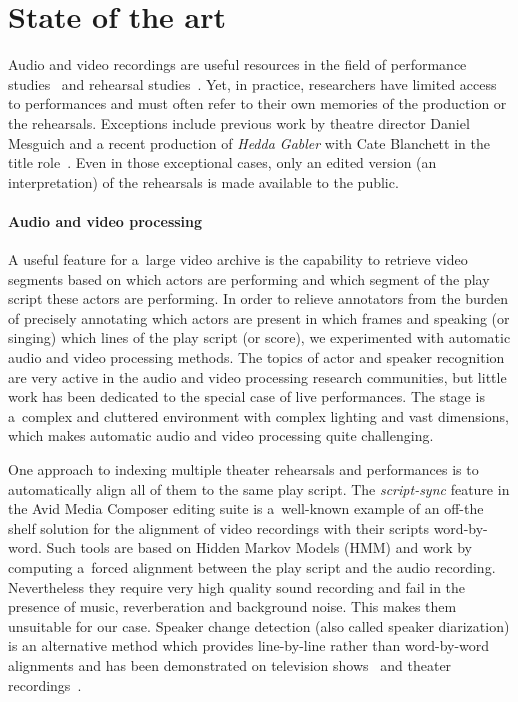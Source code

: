 \documentclass[conference]{IEEEtran}
\newcommand{\todo}[1]{\noindent\textcolor{red}{{\bf \{ToDo} #1{\bf \}}}}
\begin{document}


\section{State of the art}
\label{sec:stateoftheart}

Audio and video recordings are useful resources in the field of performance studies~\cite{mcauley1994video,Bravo07} and rehearsal studies~\cite{McAuley06,McAuley08}. Yet, in practice, researchers have limited access to performances and must often refer to their own memories of the production or the rehearsals. Exceptions include previous work by theatre director Daniel Mesguich\cite{Bouchez07}  and a recent production of \emph{Hedda Gabler} with Cate Blanchett in the title role~\cite{Darling07}. Even in those exceptional cases, only an edited version (an interpretation)  of the rehearsals is made available to the public.



\paragraph*{Audio and video processing}
A useful feature for a~large video archive is the capability to retrieve video segments based on which actors 
are performing and which segment of the play script these actors are performing. In order to relieve annotators from the burden of precisely annotating which actors are present in which frames and speaking (or singing) which lines of the play script (or score),  we experimented with automatic audio and video processing methods. The topics of actor and speaker recognition are very active in the audio and video processing research communities, but little work has been dedicated to the special case of live performances. The stage is a~complex and cluttered environment  with complex lighting and vast dimensions, which makes automatic audio and video processing quite challenging. 

One approach to indexing multiple theater rehearsals and performances is to automatically align
all of them to the same play script. The {\em script-sync} feature in the Avid Media Composer editing suite
is a~well-known example of an off-the shelf solution for the alignment of video recordings with their scripts word-by-word. Such tools are based on Hidden Markov Models (HMM) and work by computing  a~forced alignment 
between the play script and the audio recording. Nevertheless they require very high quality 
sound recording and fail in the presence of music, reverberation and background noise. This makes them
unsuitable for our case. Speaker change detection (also called speaker diarization) is an alternative method
which provides line-by-line rather than word-by-word alignments and has been demonstrated 
on television shows~\cite{Sankar09} and theater recordings~\cite{Caillet13}. 
\end{document}
